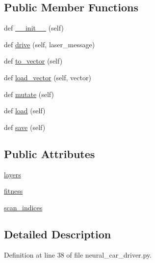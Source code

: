 \subsection*{Public Member Functions}
\begin{DoxyCompactItemize}
\item 
def \hyperlink{classneural__car__driver_1_1_neural_car_driver_ab0cc2f18e4345f9814fa137028336d1a}{\+\_\+\+\_\+init\+\_\+\+\_\+} (self)
\item 
def \hyperlink{classneural__car__driver_1_1_neural_car_driver_ab46c72e7432f683a99788c8efc3c9741}{drive} (self, laser\+\_\+message)
\item 
def \hyperlink{classneural__car__driver_1_1_neural_car_driver_aa9ca18514eaf2ebe42c9c88f6c99ccac}{to\+\_\+vector} (self)
\item 
def \hyperlink{classneural__car__driver_1_1_neural_car_driver_a4c42a4dff190065b381d5de451accf9f}{load\+\_\+vector} (self, vector)
\item 
def \hyperlink{classneural__car__driver_1_1_neural_car_driver_a1c57aa3cbee31e70a7eacb9c542d5848}{mutate} (self)
\item 
def \hyperlink{classneural__car__driver_1_1_neural_car_driver_a3ac13655a442d6106272aef2b3d3e468}{load} (self)
\item 
def \hyperlink{classneural__car__driver_1_1_neural_car_driver_a9c9664d22b7e0f75f9908de73f7cf301}{save} (self)
\end{DoxyCompactItemize}
\subsection*{Public Attributes}
\begin{DoxyCompactItemize}
\item 
\hyperlink{classneural__car__driver_1_1_neural_car_driver_a425f558140c554a734fad61b9eb83940}{layers}
\item 
\hyperlink{classneural__car__driver_1_1_neural_car_driver_a4d709e4419449add88e2a1a5d825e918}{fitness}
\item 
\hyperlink{classneural__car__driver_1_1_neural_car_driver_ac7a4e813a3f642cdb4c88a3c7bcc0ac7}{scan\+\_\+indices}
\end{DoxyCompactItemize}


\subsection{Detailed Description}


Definition at line 38 of file neural\+\_\+car\+\_\+driver.\+py.



